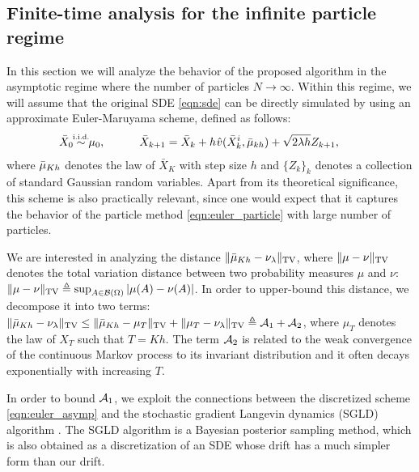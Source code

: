 
\subsection{Finite-time analysis for the infinite particle regime}



In this section we will analyze the behavior of the proposed algorithm in the asymptotic regime where the number of particles $N \rightarrow \infty$. Within this regime, we will assume that the original SDE \eqref{eqn:sde} can be directly simulated by using an approximate Euler-Maruyama scheme, defined as follows:
\begin{align}
\bar{X}_0 \simiid \mu_0, \quad \qquad \bar{X}_{k+1} = \bar{X}_k + h \hspace{0.5pt} \hat{v}(\bar{X}^i_k, \bar{\mu}_{kh} ) + \sqrt{2 \lambda h} Z_{k+1}, \qquad \label{eqn:euler_asymp}
\end{align}
where $\bar{\mu}_{Kh}$ denotes the law of $\bar{X}_K$ with step size $h$ and $\{Z_k\}_{k}$ denotes a collection of standard Gaussian random variables. Apart from its theoretical significance, this scheme is also practically relevant, since one would expect that it captures the behavior of the particle method \eqref{eqn:euler_particle} with large number of particles. 

We are interested in analyzing the distance $\| \bar{\mu}_{Kh} - \nu_\lambda \|_{\textnormal{TV}}$, where $\|\mu-\nu\|_{\textnormal{TV}}$ denotes the total variation distance between two probability measures $\mu$ and $\nu$: $\|\mu-\nu\|_{\textnormal{TV}}\triangleq \sup_{A \in {\cal B}(\Omega)} |\mu(A) -\nu(A) |$. 
%
In order to upper-bound this distance, we decompose it into two terms: $\| \bar{\mu}_{Kh} - \nu_\lambda \|_{\textnormal{TV}} \leq \| \bar{\mu}_{Kh} - \mu_T \|_{\textnormal{TV}} + \| \mu_{T} - \nu_\lambda \|_{\textnormal{TV}} \triangleq {\cal A}_1 + {\cal A}_2$, where $\mu_T$ denotes the law of $X_T$ such that $T=Kh$. The term ${\cal A}_2$ is related to the weak convergence of the continuous Markov process to its invariant distribution and it often decays exponentially with increasing $T$. 

In order to bound ${\cal A}_1$, we exploit the connections between the discretized scheme \eqref{eqn:euler_asymp} and the stochastic gradient Langevin dynamics (SGLD) algorithm \cite{WelTeh2011a}. The SGLD algorithm is a Bayesian posterior sampling method, which is also obtained as a discretization of an SDE whose drift has a much simpler form than our drift.   

